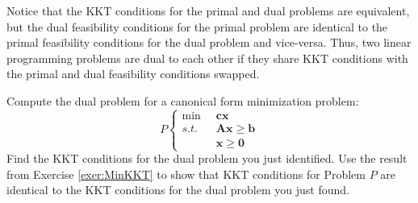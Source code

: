 \begin{remark} Notice that the KKT conditions for the primal and dual problems are equivalent, but the dual feasibility conditions for the primal problem are identical to the primal feasibility conditions for the dual problem and vice-versa. Thus, two linear programming problems are dual to each other if they share KKT conditions with the primal and dual feasibility conditions swapped.
\end{remark}


\begin{exercise} Compute the dual problem for a canonical form minimization problem:
\begin{displaymath}
P\left\{
\begin{aligned}
\min\;\;&\mathbf{c}\mathbf{x}\\
s.t.\;\;&\mathbf{A}\mathbf{x} \geq \mathbf{b}\\
& \mathbf{x} \geq \mathbf{0}
\end{aligned}\right.
\end{displaymath}
Find the KKT conditions for the dual problem you just identified. Use the result from Exercise \ref{exer:MinKKT} to show that KKT conditions for Problem $P$ are identical to the KKT conditions for the dual problem you just found.
\end{exercise}

